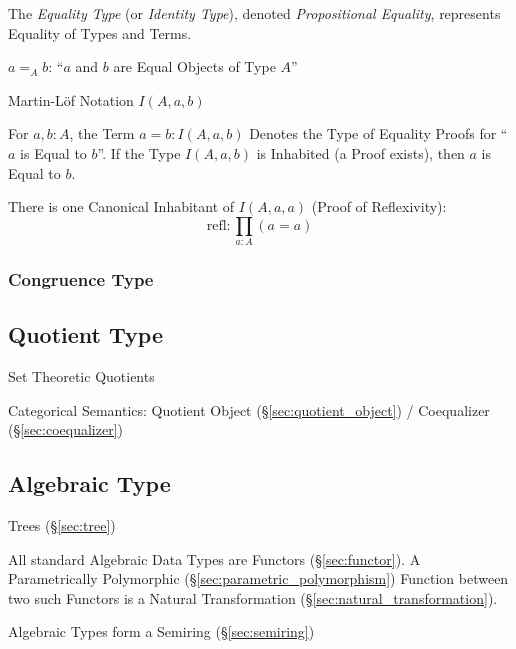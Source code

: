 The \emph{Equality Type} (or \emph{Identity Type}), denoted
\emph{Propositional Equality}, represents Equality of Types and Terms.

$a =_A b$: ``$a$ and $b$ are Equal Objects of Type $A$''

Martin-L\"of Notation $I(A,a,b)$

For $a,b:A$, the Term $a = b : I(A,a,b)$ Denotes the Type of Equality
Proofs for ``$a$ is Equal to $b$''. If the Type $I(A,a,b)$ is
Inhabited (a Proof exists), then $a$ is Equal to $b$.

There is one Canonical Inhabitant of $I(A,a,a)$ (Proof of
Reflexivity):
\[
  \text{refl}: \prod_{a:A} (a=a)
\]



\subsubsection{Congruence Type}\label{sec:congruence_type}




\subsection{Quotient Type}\label{sec:quotient_type}\hfill

Set Theoretic Quotients

Categorical Semantics: Quotient Object (\S\ref{sec:quotient_object}) /
Coequalizer (\S\ref{sec:coequalizer})



\subsection{Algebraic Type}\label{sec:algebraic_type}

Trees (\S\ref{sec:tree})

All standard Algebraic Data Types are Functors (\S\ref{sec:functor}).
A Parametrically Polymorphic (\S\ref{sec:parametric_polymorphism})
Function between two such Functors is a Natural Transformation
(\S\ref{sec:natural_transformation}).

Algebraic Types form a Semiring (\S\ref{sec:semiring})



